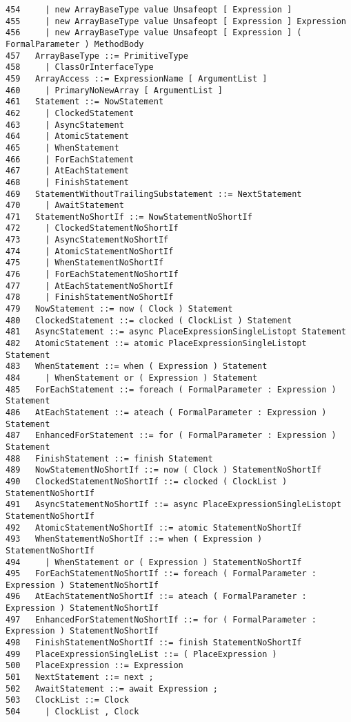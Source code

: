 {\begin{verbatim}
454     | new ArrayBaseType value Unsafeopt [ Expression ]
455     | new ArrayBaseType value Unsafeopt [ Expression ] Expression
456     | new ArrayBaseType value Unsafeopt [ Expression ] ( FormalParameter ) MethodBody
457   ArrayBaseType ::= PrimitiveType
458     | ClassOrInterfaceType
459   ArrayAccess ::= ExpressionName [ ArgumentList ]
460     | PrimaryNoNewArray [ ArgumentList ]
461   Statement ::= NowStatement
462     | ClockedStatement
463     | AsyncStatement
464     | AtomicStatement
465     | WhenStatement
466     | ForEachStatement
467     | AtEachStatement
468     | FinishStatement
469   StatementWithoutTrailingSubstatement ::= NextStatement
470     | AwaitStatement
471   StatementNoShortIf ::= NowStatementNoShortIf
472     | ClockedStatementNoShortIf
473     | AsyncStatementNoShortIf
474     | AtomicStatementNoShortIf
475     | WhenStatementNoShortIf
476     | ForEachStatementNoShortIf
477     | AtEachStatementNoShortIf
478     | FinishStatementNoShortIf
479   NowStatement ::= now ( Clock ) Statement
480   ClockedStatement ::= clocked ( ClockList ) Statement
481   AsyncStatement ::= async PlaceExpressionSingleListopt Statement
482   AtomicStatement ::= atomic PlaceExpressionSingleListopt Statement
483   WhenStatement ::= when ( Expression ) Statement
484     | WhenStatement or ( Expression ) Statement
485   ForEachStatement ::= foreach ( FormalParameter : Expression ) Statement
486   AtEachStatement ::= ateach ( FormalParameter : Expression ) Statement
487   EnhancedForStatement ::= for ( FormalParameter : Expression ) Statement
488   FinishStatement ::= finish Statement
489   NowStatementNoShortIf ::= now ( Clock ) StatementNoShortIf
490   ClockedStatementNoShortIf ::= clocked ( ClockList ) StatementNoShortIf
491   AsyncStatementNoShortIf ::= async PlaceExpressionSingleListopt StatementNoShortIf
492   AtomicStatementNoShortIf ::= atomic StatementNoShortIf
493   WhenStatementNoShortIf ::= when ( Expression ) StatementNoShortIf
494     | WhenStatement or ( Expression ) StatementNoShortIf
495   ForEachStatementNoShortIf ::= foreach ( FormalParameter : Expression ) StatementNoShortIf
496   AtEachStatementNoShortIf ::= ateach ( FormalParameter : Expression ) StatementNoShortIf
497   EnhancedForStatementNoShortIf ::= for ( FormalParameter : Expression ) StatementNoShortIf
498   FinishStatementNoShortIf ::= finish StatementNoShortIf
499   PlaceExpressionSingleList ::= ( PlaceExpression )
500   PlaceExpression ::= Expression
501   NextStatement ::= next ;
502   AwaitStatement ::= await Expression ;
503   ClockList ::= Clock
504     | ClockList , Clock

\end{verbatim}}
